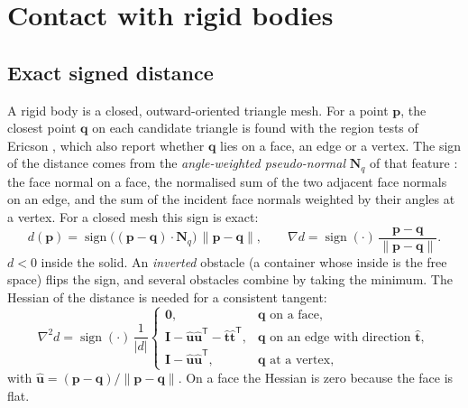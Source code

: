 \documentclass[11pt,a4paper]{article}
\newcommand{\vect}[1]{\bm{#1}}
\newcommand{\I}{\mathbf{I}}
\theoremstyle{remark}
\begin{document}
\section{Contact with rigid bodies}\label{sec:rigid}

\subsection{Exact signed distance}

A rigid body is a closed, outward-oriented triangle mesh. For a point $\vect{p}$, the closest point
$\vect{q}$ on each candidate triangle is found with the region tests of Ericson
\cite{ericson2004}, which also report whether $\vect{q}$ lies on a face, an edge or a vertex. The
sign of the distance comes from the \emph{angle-weighted pseudo-normal} $\vect{N}_q$ of that
feature \cite{baerentzen2005}: the face normal on a face, the normalised sum of the two adjacent
face normals on an edge, and the sum of the incident face normals weighted by their angles at a
vertex. For a closed mesh this sign is exact:
\begin{equation}
d(\vect{p}) = \operatorname{sign}\big((\vect{p}-\vect{q})\cdot\vect{N}_q\big)\,\|\vect{p}-\vect{q}\|,
\qquad \nabla d = \operatorname{sign}(\cdot)\,\frac{\vect{p}-\vect{q}}{\|\vect{p}-\vect{q}\|}.
\end{equation}
$d<0$ inside the solid. An \emph{inverted} obstacle (a container whose inside is the free space)
flips the sign, and several obstacles combine by taking the minimum. The Hessian of the distance
is needed for a consistent tangent:
\begin{equation}
\nabla^2 d = \operatorname{sign}(\cdot)\,\frac{1}{|d|}\begin{cases}
\mathbf{0}, & \vect{q} \text{ on a face},\\
\I - \hat{\vect{u}}\hat{\vect{u}}^{\mathsf T} - \hat{\vect{t}}\hat{\vect{t}}^{\mathsf T}, & \vect{q} \text{ on an edge with direction } \hat{\vect{t}},\\
\I - \hat{\vect{u}}\hat{\vect{u}}^{\mathsf T}, & \vect{q} \text{ at a vertex},
\end{cases}
\end{equation}
with $\hat{\vect{u}} = (\vect{p}-\vect{q})/\|\vect{p}-\vect{q}\|$. On a face the Hessian is zero
because the face is flat.
\end{document}

